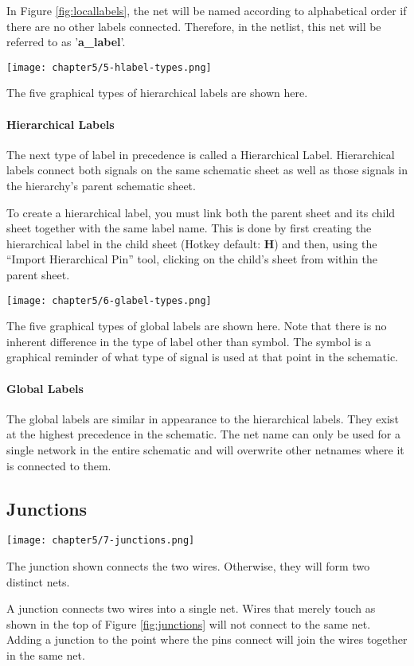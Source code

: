 In Figure \ref{fig:locallabels}, the net will be named according to alphabetical order if there are no other labels connected.
Therefore, in the netlist, this net will be referred to as '\textbf{a\_label}'.

\begin{marginfigure}
	\texttt{[image: chapter5/5-hlabel-types.png]}
	\caption[Hierarchical Labels]{
		The five graphical types of hierarchical labels are shown here.
	}
	\label{fig:hlabel-types}
\end{marginfigure}
\paragraph{Hierarchical Labels} The next type of label in precedence is called a Hierarchical Label.
Hierarchical labels connect both signals on the same schematic sheet as well as those signals in the hierarchy's parent schematic sheet.

To create a hierarchical label, you must link both the parent sheet and its child sheet together with the same label name.
This is done by first creating the hierarchical label in the child sheet (Hotkey default: \textbf{H}) and then, using the ``Import Hierarchical Pin'' tool, clicking on the child's sheet from within the parent sheet.

\begin{marginfigure}
	\texttt{[image: chapter5/6-glabel-types.png]}
	\caption[Global Labels]{
		The five graphical types of global labels are shown here.
		Note that there is no inherent difference in the type of label other than symbol.
		The symbol is a graphical reminder of what type of signal is used at that point in the schematic.
	}
	\label{fig:glabel-types}
\end{marginfigure}
\paragraph{Global Labels} The global labels are similar in appearance to the hierarchical labels.
They exist at the highest precedence in the schematic.
The net name can only be used for a single network in the entire schematic and will overwrite other netnames where it is connected to them.

\subsection{Junctions}
\begin{marginfigure}
	\texttt{[image: chapter5/7-junctions.png]}
	\caption[Wires with and without a junction]{
		The junction shown connects the two wires.
		Otherwise, they will form two distinct nets.
	}
	\label{fig:junctions}
\end{marginfigure}
A junction connects two wires into a single net.
Wires that merely touch as shown in the top of Figure \ref{fig:junctions} will not connect to the same net.
Adding a junction to the point where the pins connect will join the wires together in the same net.

